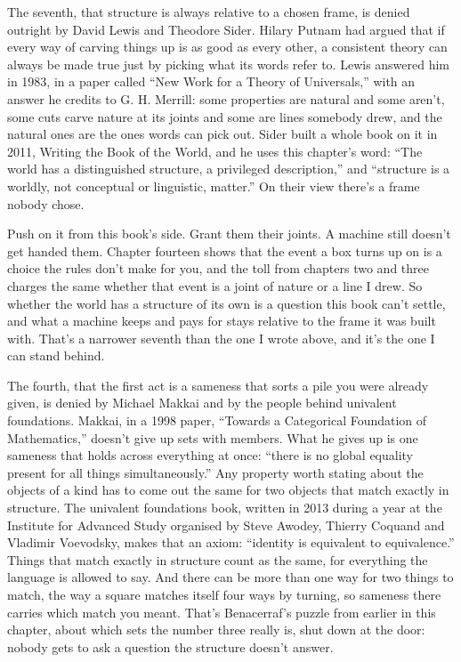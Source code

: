 \documentclass[11pt,twoside]{article}
\theoremstyle{thielethm}
\theoremstyle{thieledef}
\theoremstyle{thieledef}
\theoremstyle{thieledef}
\theoremstyle{thielethm}
\theoremstyle{thieleobs}
\theoremstyle{thielethm}
\begin{document}
The seventh, that structure is always relative to a chosen frame, is denied outright by David Lewis and Theodore Sider. Hilary Putnam had argued that if every way of carving things up is as good as every other, a consistent theory can always be made true just by picking what its words refer to. Lewis answered him in 1983, in a paper called ``New Work for a Theory of Universals,'' with an answer he credits to G. H. Merrill: some properties are natural and some aren't, some cuts carve nature at its joints and some are lines somebody drew, and the natural ones are the ones words can pick out. Sider built a whole book on it in 2011, Writing the Book of the World, and he uses this chapter's word: ``The world has a distinguished structure, a privileged description,'' and ``structure is a worldly, not conceptual or linguistic, matter.'' On their view there's a frame nobody chose.

Push on it from this book's side. Grant them their joints. A machine still doesn't get handed them. Chapter fourteen shows that the event a box turns up on is a choice the rules don't make for you, and the toll from chapters two and three charges the same whether that event is a joint of nature or a line I drew. So whether the world has a structure of its own is a question this book can't settle, and what a machine keeps and pays for stays relative to the frame it was built with. That's a narrower seventh than the one I wrote above, and it's the one I can stand behind.

The fourth, that the first act is a sameness that sorts a pile you were already given, is denied by Michael Makkai and by the people behind univalent foundations. Makkai, in a 1998 paper, ``Towards a Categorical Foundation of Mathematics,'' doesn't give up sets with members. What he gives up is one sameness that holds across everything at once: ``there is no global equality present for all things simultaneously.'' Any property worth stating about the objects of a kind has to come out the same for two objects that match exactly in structure. The univalent foundations book, written in 2013 during a year at the Institute for Advanced Study organised by Steve Awodey, Thierry Coquand and Vladimir Voevodsky, makes that an axiom: ``identity is equivalent to equivalence.'' Things that match exactly in structure count as the same, for everything the language is allowed to say. And there can be more than one way for two things to match, the way a square matches itself four ways by turning, so sameness there carries which match you meant. That's Benacerraf's puzzle from earlier in this chapter, about which sets the number three really is, shut down at the door: nobody gets to ask a question the structure doesn't answer.
\end{document}
